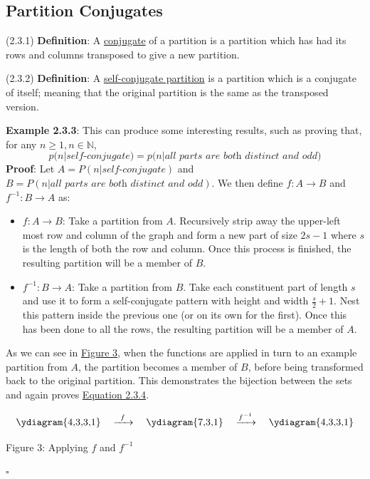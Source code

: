 \documentclass{article}
\newcommand{\separate}[1] {\vspace{#1 pt}\noindent}
\newcommand{\N}{\mathbb{N}}
\newcommand{\definition}[2]{(#1) \textbf{Definition}: #2}
\newcommand{\proof}[1]{\textbf{Proof}: #1 \begin{flushright}\(\square\)\end{flushright}}
\begin{document}
\subsection{Partition Conjugates}

\definition{2.3.1}{A \underline{conjugate} of a partition is a partition which has had its rows and columns transposed to give a new partition.}

\separate{5}\definition{2.3.2}{A \underline{self-conjugate partition} is a partition which is a conjugate of itself; meaning that the original partition is the same as the transposed version.}

\newpage\noindent\textbf{Example 2.3.3}: This can produce some interesting results, such as proving that, for any \(n \geq 1, n \in \N\), 
\begin{equation}\tag{2.3.4}\label{equ:2.3.4}
    p(n|\textit{self-conjugate}) = p(n|\textit{all parts are both distinct and odd)}
\end{equation}
\proof{Let \(A = P(n|\textit{self-conjugate})\) and \(B = P(n|\textit{all parts are both distinct and odd})\). We then define \(f:A \rightarrow B\) and \(f^{-1}: B \rightarrow A\) as:
\begin{itemize}
    \item \(f:A \rightarrow B\): Take a partition from \(A\). Recursively strip away the upper-left most row and column of the graph and form a new part of size \(2s-1\) where \(s\) is the length of both the row and column. Once this process is finished, the resulting partition will be a member of \(B\).
    \item \(f^{-1}: B \rightarrow A\): Take a partition from \(B\). Take each constituent part of length \(s\) and use it to form a self-conjugate pattern with height and width \(\frac{s}{2}+1\). Nest this pattern inside the previous one (or on its own for the first). Once this has been done to all the rows, the resulting partition will be a member of \(A\).
\end{itemize}
As we can see in \hyperref[fig:3]{Figure 3}, when the functions are applied in turn to an example partition from \(A\), the partition becomes a member of \(B\), before being transformed back to the original partition. This demonstrates the bijection between the sets and again proves \hyperref[equ:2.3.4]{Equation 2.3.4}.

\[
    \vcenter{\hbox{\ydiagram{4,3,3,1}}}
    \quad\xrightarrow{\;\;f\;\;}\quad
    \vcenter{\hbox{\ydiagram{7,3,1}}}
    \quad\xrightarrow{f^{-1}}\quad
    \vcenter{\hbox{\ydiagram{4,3,3,1}}}
\]\label{fig:3}
{\centering Figure 3: Applying \(f\) and \(f^{-1}\) \par}}
\end{document}

